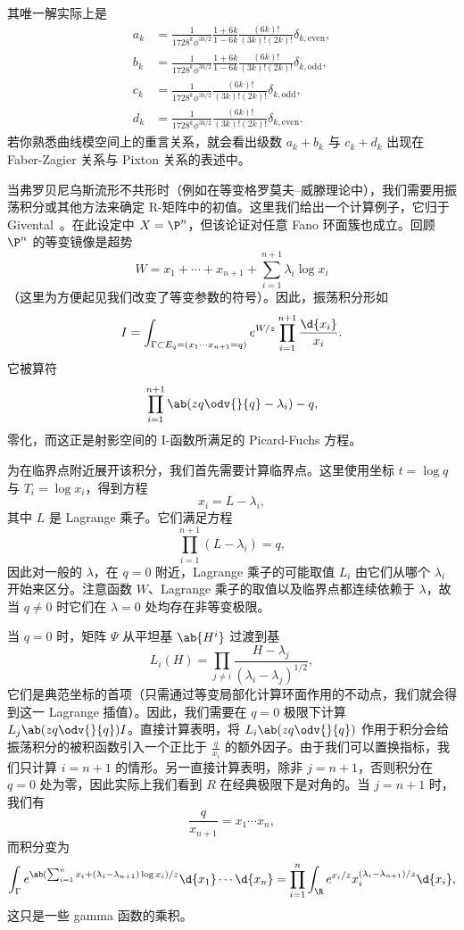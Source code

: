 其唯一解实际上是
\begin{align*}
    a_k &= \frac{1}{1728^k \phi^{3k/2}} \frac{1+6k}{1-6k} \frac{(6k)!}{(3k)!(2k)!} \delta_{k, \text{even}},  \\
    b_k &= \frac{1}{1728^k \phi^{3k/2}} \frac{1+6k}{1-6k}\frac{(6k)!}{(3k)!(2k)!} \delta_{k, \text{odd}},  \\
    c_k &= \frac{1}{1728^k \phi^{3k/2}}\frac{(6k)!}{(3k)!(2k)!} \delta_{k, \text{odd}}, \\
    d_k &= \frac{1}{1728^k \phi^{3k/2}} \frac{(6k)!}{(3k)!(2k)!} \delta_{k, \text{even}}. 
\end{align*}
若你熟悉曲线模空间上的重言关系，就会看出级数 \(a_k + b_k\) 与 \(c_k + d_k\) 出现在 Faber-Zagier 关系与 Pixton 关系的表述中。

当弗罗贝尼乌斯流形不共形时（例如在等变格罗莫夫–威滕理论中），我们需要用振荡积分或其他方法来确定 R-矩阵中的初值。这里我们给出一个计算例子，它归于 Givental~\cite{Givental2001semisimple}。在此设定中 \(X = \P^n\)，但该论证对任意 Fano 环面簇也成立。回顾 \(\P^n\) 的等变镜像是超势
\[ W = x_1 + \cdots + x_{n+1} + \sum_{i=1}^{n+1} \lambda_i \log x_i \]
（这里为方便起见我们改变了等变参数的符号）。因此，振荡积分形如
\[ I = \int_{\Gamma \subset E_q = (x_1 \cdots x_{n+1}=q)} e^{W/z} \prod_{i=1}^{n+1} \frac{\d{x_i}}{x_i}. \]
它被算符
\[ \prod_{i=1}^{n+1}\ab(zq \odv{}{q} -\lambda_i) - q, \]
零化，而这正是射影空间的 I-函数所满足的 Picard-Fuchs 方程。

为在临界点附近展开该积分，我们首先需要计算临界点。这里使用坐标 \(t = \log q\) 与 \(T_i = \log x_i\)，得到方程
\[ x_i = L - \lambda_i, \]
其中 \(L\) 是 Lagrange 乘子。它们满足方程
\[ \prod_{i=1}^{n+1} (L - \lambda_i) = q, \]
因此对一般的 \(\lambda\)，在 \(q = 0\) 附近，Lagrange 乘子的可能取值 \(L_i\) 由它们从哪个 \(\lambda_i\) 开始来区分。注意函数 \(W\)、Lagrange 乘子的取值以及临界点都连续依赖于 \(\lambda\)，故当 \(q \neq 0\) 时它们在 \(\lambda = 0\) 处均存在非等变极限。

当 \(q = 0\) 时，矩阵 \(\Psi\) 从平坦基 \(\ab{H^i}\) 过渡到基
\[ L_i(H) = \prod_{j \neq i} \frac{H - \lambda_j}{(\lambda_i - \lambda_j)^{1/2}}, \]
它们是典范坐标的首项（只需通过等变局部化计算环面作用的不动点，我们就会得到这一 Lagrange 插值）。因此，我们需要在 \(q = 0\) 极限下计算 \(L_j \ab(z q \odv{}{q}) I\)。直接计算表明，将 \(L_i \ab(z q \odv{}{q})\) 作用于积分会给振荡积分的被积函数引入一个正比于 \(\frac{q}{x_i}\) 的额外因子。由于我们可以置换指标，我们只计算 \(i = n+1\) 的情形。另一直接计算表明，除非 \( j = n+1\)，否则积分在 \(q = 0\) 处为零，因此实际上我们看到 \(R\) 在经典极限下是对角的。当 \(j = n+1\) 时，我们有
\[ \frac{q}{x_{n+1}} = x_1 \cdots x_n, \]
而积分变为
\[ \int_{\Gamma} e^{\ab( \sum_{i=1}^n x_i + (\lambda_i - \lambda_{n+1})\log x_i ) / z} \d{x_1} \cdots \d{x_n} = \prod_{i=1}^n \int_{\R} e^{x_i/z} x_i^{(\lambda_i - \lambda_{n+1})/z} \d{x_i}, \]
这只是一些 gamma 函数的乘积。

